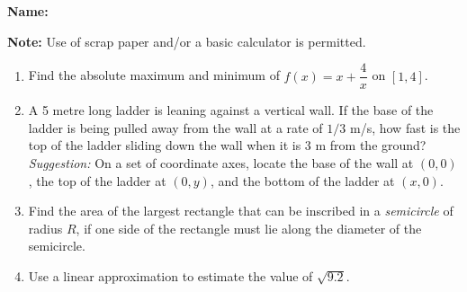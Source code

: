 \documentclass[12pt]{article}
\newcommand{\points}[1]{\marginpar{\hspace{24pt}[#1]}}
\begin{document}
{\bf \large Name:} \hspace{2.5in} 

\bigskip

{\bf Note:} Use of scrap paper and/or a basic calculator is permitted.

\thispagestyle{fancy}

 \begin{enumerate}
 \item  Find the absolute maximum and minimum of $f(x)=x+\dfrac{4}{x}$ on $[1,4]$. \points{4}

\vspace{3.5in}

 \item A 5 metre long ladder is leaning against a vertical wall. If the base of the ladder is being pulled away from the wall at a rate of $1/3$ m/s, how fast is the top of the ladder sliding down the wall when it is 3 m from the ground? \points{4}\\
 \textit{Suggestion:} On a set of coordinate axes, locate the base of the wall at $(0,0)$, the top of the ladder at $(0,y)$, and the bottom of the ladder at $(x,0)$.

\newpage

 \item Find the area of the largest rectangle that can be inscribed in a \textit{semicircle} of radius $R$, if one side of the rectangle must lie along the diameter of the semicircle. \points{4}

\vspace{5in}

 \item Use a linear approximation to estimate the value of $\sqrt{9.2}$. \points{4}



\end{enumerate}
\end{document}
